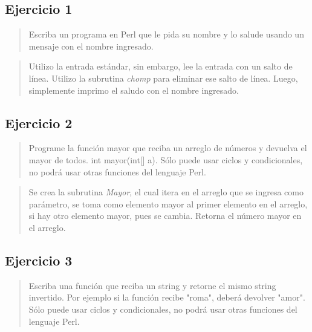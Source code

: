 \documentclass{article}
\begin{document}
  \subsection{Ejercicio 1}

  \begin{quote}
    Escriba un programa en Perl que le pida su nombre y lo salude usando un mensaje con el nombre ingresado.
  \end{quote}

  
    

  \begin{quote}
    Utilizo la entrada estándar, sin embargo, lee la entrada con un salto de línea. Utilizo la subrutina \textit{chomp} para eliminar ese salto de línea. Luego, simplemente imprimo el saludo con el nombre ingresado.
  \end{quote}

  \subsection{Ejercicio 2}

  \begin{quote}
    Programe la función mayor que reciba un arreglo de números y devuelva el mayor de todos. int mayor(int[] a). Sólo puede usar ciclos y condicionales, no  podrá usar otras funciones del lenguaje Perl.
  \end{quote}

  

  \begin{quote}
    Se crea la subrutina \textit{Mayor}, el cual itera en el arreglo que se ingresa como parámetro, se toma como elemento mayor al primer elemento en el arreglo, si hay otro elemento mayor, pues se cambia. Retorna el número mayor en el arreglo.
  \end{quote}

  \subsection{Ejercicio 3}

  \begin{quote}
    Escriba una función que reciba un string y retorne el mismo string invertido. Por ejemplo si la función recibe "roma", deberá devolver "amor". Sólo puede usar ciclos y condicionales, no podrá usar otras funciones del lenguaje Perl.
  \end{quote}
\end{document}
